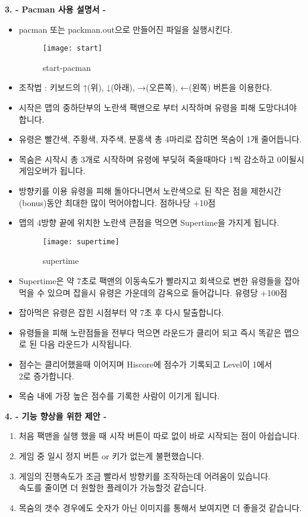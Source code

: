 \documentclass{article}
\begin{document}
\newpage
\begin{large}\textbf{3. - Pacman 사용 설명서 -}\end{large}
\begin{itemize}
\item pacman 또는 packman.out으로 만들어진 파일을 실행시킨다.
\begin{figure}[!h]
\centering
\texttt{[image: start]}
\caption{start-pacman}%
\end{figure}
\item 조작법 : 키보드의 ↑(위), ↓(아래), →(오른쪽), ←(왼쪽) 버튼을 이용한다.
\item 시작은 맵의 중하단부의 노란색 팩맨으로 부터 시작하며 유령을 피해 도망다녀야 합니다.
\item 유령은 빨간색, 주황색, 자주색, 분홍색 총 4마리로 잡히면 목숨이 1개 줄어듭니다.
\item 목숨은 시작시 총 3개로 시작하며 유령에 부딪혀 죽을때마다 1씩 감소하고 0이될시 게임오버가 됩니다.
\item 방향키를 이용 유령을 피해 돌아다니면서 노란색으로 된 작은 점을 제한시간(bonus)동안 최대한 많이 먹어야합니다. 점하나당 +10점
\item 맵의 4방향 끝에 위치한 노란색 큰점을 먹으면 Supertime을 가지게 됩니다.
\newpage

\begin{figure}[!h]
\centering
\texttt{[image: supertime]}
\caption{supertime}%
\end{figure}

\item Supertime은 약 7초로 팩맨의 이동속도가 빨라지고 회색으로 변한 유령들을 잡아먹을 수 있으며 잡을시 유령은 가운데의 감옥으로 들어갑니다. 유령당 +100점
\item 잡아먹은 유령은 잡힌 시점부터 약 7초 후 다시 탈출합니다.
\item 유령들을 피해 노란점들을 전부다 먹으면 라운드가 클리어 되고 즉시 똑같은 맵으로 된 다음 라운드가 시작됩니다.
\item 점수는 클리어했을때 이어지며 Hiscore에 점수가 기록되고 Level이 1에서\\ 2로 증가합니다.
\item 목숨 내에 가장 높은 점수를 기록한 사람이 이기게 됩니다.
\end{itemize}

\newpage

\begin{large}\textbf{4. - 기능 향상을 위한 제안 -}\end{large}
\begin{enumerate}
\item 처음 팩맨을 실행 했을 때 시작 버튼이 따로 없이 바로 시작되는 점이 아쉽습니다.
\item 게임 중 일시 정지 버튼 or 키가 없는게 불편했습니다.
\item 게임의 진행속도가 조금 빨라서 방향키를 조작하는데 어려움이 있습니다.\\ 속도를 줄이면 더 원할한 플레이가 가능할것 같습니다.
\item 목숨의 갯수 경우에도 숫자가 아닌 이미지를 통해서 보여지면 더 좋을것 같습니다.
\end{enumerate}
\end{document}
